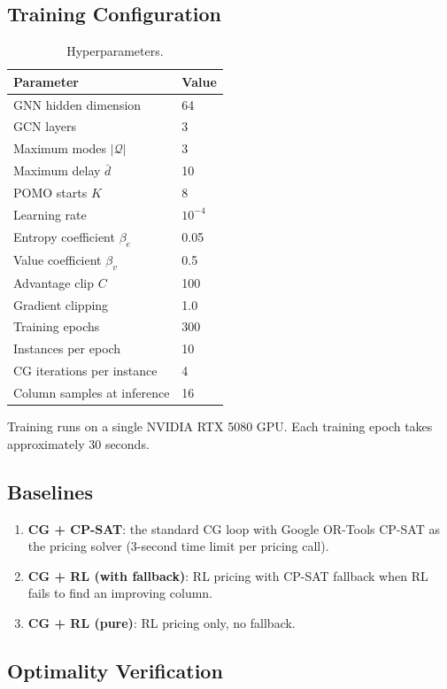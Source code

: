 \documentclass[11pt]{article}
\newcommand{\calQ}{\mathcal{Q}}
\begin{document}
\subsection{Training Configuration}

\begin{table}[h]
\centering
\caption{Hyperparameters.}
\label{tab:hyper}
\begin{tabular}{ll}
\toprule
Parameter & Value \\
\midrule
GNN hidden dimension & 64 \\
GCN layers & 3 \\
Maximum modes $|\calQ|$ & 3 \\
Maximum delay $\bar{d}$ & 10 \\
POMO starts $K$ & 8 \\
Learning rate & $10^{-4}$ \\
Entropy coefficient $\beta_e$ & 0.05 \\
Value coefficient $\beta_v$ & 0.5 \\
Advantage clip $C$ & 100 \\
Gradient clipping & 1.0 \\
Training epochs & 300 \\
Instances per epoch & 10 \\
CG iterations per instance & 4 \\
Column samples at inference & 16 \\
\bottomrule
\end{tabular}
\end{table}

Training runs on a single NVIDIA RTX 5080 GPU.
Each training epoch takes approximately 30 seconds.

\subsection{Baselines}

\begin{enumerate}
    \item \textbf{CG + CP-SAT}: the standard CG loop with Google OR-Tools CP-SAT as the pricing solver (3-second time limit per pricing call).
    \item \textbf{CG + RL (with fallback)}: RL pricing with CP-SAT fallback when RL fails to find an improving column.
    \item \textbf{CG + RL (pure)}: RL pricing only, no fallback.
\end{enumerate}

\subsection{Optimality Verification}
\end{document}
